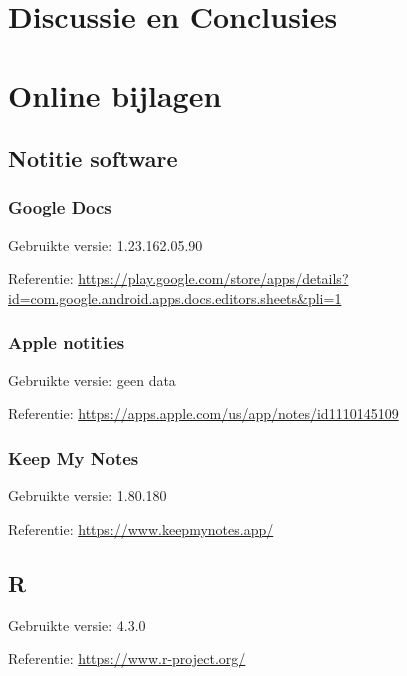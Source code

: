 \documentclass[
]{article}
\begin{document}
\hypertarget{discussie-en-conclusies}{%
\section{Discussie en Conclusies}\label{discussie-en-conclusies}}

\hypertarget{online-bijlagen}{%
\section{Online bijlagen}\label{online-bijlagen}}

\hypertarget{notitie-software}{%
\subsection{Notitie software}\label{notitie-software}}

\hypertarget{g-docs}{%
\subsubsection{Google Docs}\label{g-docs}}

Gebruikte versie: 1.23.162.05.90

Referentie:
\url{https://play.google.com/store/apps/details?id=com.google.android.apps.docs.editors.sheets\&pli=1}

\hypertarget{a-notes}{%
\subsubsection{Apple notities}\label{a-notes}}

Gebruikte versie: geen data

Referentie: \url{https://apps.apple.com/us/app/notes/id1110145109}

\hypertarget{keep-my-notes}{%
\subsubsection{Keep My Notes}\label{keep-my-notes}}

Gebruikte versie: 1.80.180

Referentie: \url{https://www.keepmynotes.app/}

\hypertarget{r-lang}{%
\subsection{R}\label{r-lang}}

Gebruikte versie: 4.3.0

Referentie: \url{https://www.r-project.org/}
\end{document}
